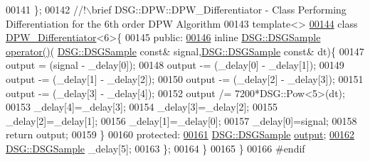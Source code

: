 \begin{DoxyCode}
00141         \};\textcolor{comment}{}
00142 \textcolor{comment}{        //!\(\backslash\)brief DSG::DPW::DPW\_Differentiator - Class Performing Differentiation for the 6th order DPW
       Algorithm}
00143 \textcolor{comment}{}        \textcolor{keyword}{template}<>
\hypertarget{_d_p_w_8h_source_l00144}{}\hyperlink{class_d_s_g_1_1_d_p_w_1_1_d_p_w___differentiator_3_016_01_4}{00144}         \textcolor{keyword}{class }\hyperlink{class_d_s_g_1_1_d_p_w_1_1_d_p_w___differentiator}{DPW\_Differentiator}<6>\{
00145         \textcolor{keyword}{public}:
\hypertarget{_d_p_w_8h_source_l00146}{}\hyperlink{class_d_s_g_1_1_d_p_w_1_1_d_p_w___differentiator_3_016_01_4_a82356846abaeef0ed76e9803a7863f3c}{00146}             \textcolor{keyword}{inline} \hyperlink{namespace_d_s_g_ac39a94cd27ebcd9c1e7502d0c624894a}{DSG::DSGSample} \hyperlink{class_d_s_g_1_1_d_p_w_1_1_d_p_w___differentiator_3_016_01_4_a82356846abaeef0ed76e9803a7863f3c}{operator()}(
      \hyperlink{namespace_d_s_g_ac39a94cd27ebcd9c1e7502d0c624894a}{DSG::DSGSample} \textcolor{keyword}{const}& signal,\hyperlink{namespace_d_s_g_ac39a94cd27ebcd9c1e7502d0c624894a}{DSG::DSGSample} \textcolor{keyword}{const}& dt)\{
00147                 output  = (signal - \_delay[0]);
00148                 output -= (\_delay[0] - \_delay[1]);
00149                 output -= (\_delay[1] - \_delay[2]);
00150                 output -= (\_delay[2] - \_delay[3]);
00151                 output -= (\_delay[3] - \_delay[4]);
00152                 output /= 7200*DSG::Pow<5>(dt);
00153                 \_delay[4]=\_delay[3];
00154                 \_delay[3]=\_delay[2];
00155                 \_delay[2]=\_delay[1];
00156                 \_delay[1]=\_delay[0];
00157                 \_delay[0]=signal;
00158                 \textcolor{keywordflow}{return} output;
00159             \}
00160         \textcolor{keyword}{protected}:
\hypertarget{_d_p_w_8h_source_l00161}{}\hyperlink{class_d_s_g_1_1_d_p_w_1_1_d_p_w___differentiator_3_016_01_4_a6939d53801d66571b5935bcd5561548a}{00161}             \hyperlink{namespace_d_s_g_ac39a94cd27ebcd9c1e7502d0c624894a}{DSG::DSGSample} \hyperlink{class_d_s_g_1_1_d_p_w_1_1_d_p_w___differentiator_3_016_01_4_a6939d53801d66571b5935bcd5561548a}{output};
\hypertarget{_d_p_w_8h_source_l00162}{}\hyperlink{class_d_s_g_1_1_d_p_w_1_1_d_p_w___differentiator_3_016_01_4_a8f3e45aa44791b711f6e71aff92505ca}{00162}             \hyperlink{namespace_d_s_g_ac39a94cd27ebcd9c1e7502d0c624894a}{DSG::DSGSample} \_delay[5];
00163         \};
00164     \}
00165 \}
00166 \textcolor{preprocessor}{#endif}
\end{DoxyCode}
